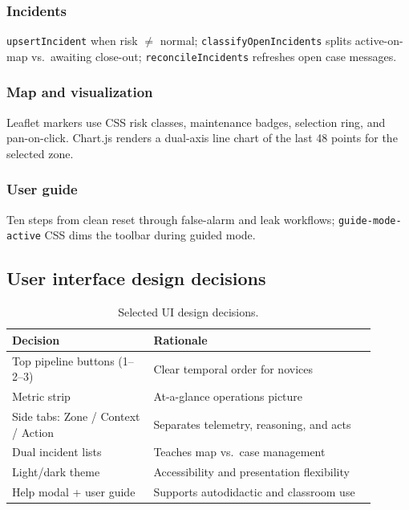 \documentclass[12pt,a4paper]{article}
\begin{document}
\subsubsection{Incidents}

\texttt{upsertIncident} when risk $\neq$ normal; \texttt{classifyOpenIncidents} splits active-on-map vs.\ awaiting close-out; \texttt{reconcileIncidents} refreshes open case messages.

\subsubsection{Map and visualization}

Leaflet markers use CSS risk classes, maintenance badges, selection ring, and pan-on-click. Chart.js renders a dual-axis line chart of the last 48 points for the selected zone.

\subsubsection{User guide}

Ten steps from clean reset through false-alarm and leak workflows; \texttt{guide-mode-active} CSS dims the toolbar during guided mode.

\subsection{User interface design decisions}

\begin{table}[htbp]
\centering
\caption{Selected UI design decisions.}
\label{tab:ui}
\begin{tabular}{@{}p{0.35\linewidth}p{0.55\linewidth}@{}}
\toprule
\textbf{Decision} & \textbf{Rationale} \\
\midrule
Top pipeline buttons (1--2--3) & Clear temporal order for novices \\
Metric strip & At-a-glance operations picture \\
Side tabs: Zone / Context / Action & Separates telemetry, reasoning, and acts \\
Dual incident lists & Teaches map vs.\ case management \\
Light/dark theme & Accessibility and presentation flexibility \\
Help modal + user guide & Supports autodidactic and classroom use \\
\bottomrule
\end{tabular}
\end{table}
\end{document}
